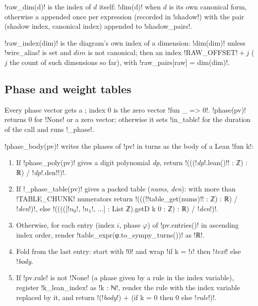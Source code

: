 {\py!raw_dim(d)! is the index of $d$ itself: \py!dim(d)! when $d$ is its own canonical form,
otherwise a  appended once per expression (recorded in \py!shadow!) with the
pair (shadow index, canonical index) appended to \py!shadow_pairs!.

\py!raw_index(dim)! is the diagram's own index of a dimension: \py!dim(dim)! unless
\py!wire_alias! is set and $\textit{dim}$ is not canonical; then an index
\py!RAW_OFFSET!${}+j$ ($j$ the count of such dimensions so far), with
\py!raw_pairs[raw] = dim(dim)!.

\subsection{Phase and weight tables}\label{sec:lean-export-net-phases}

Every phase vector gets a ; index 0 is the zero vector \code!fun _ => 0!.
\py!phase(pv)! returns 0 for \py!None! or a zero vector; otherwise it sets \py!in_table! for the
duration of the call and runs \py!_phase!.

\begin{algorithm}\label{alg:lean-export-net-phase-body}
\py!phase_body(pv)! writes the phases of \py!pv! in turns as the body of a Lean
\code!fun k!:
\begin{enumerate}
\item If \py!phase_poly(pv)! gives a digit polynomial \textit{dp}, return
  \code!(((!\textit{dp}\py!.lean()!\leanx! : ℤ) : ℝ) / !\textit{dp}\py!.den!\code!)!.
\item If \py!_phase_table(pv)! gives a packed table (\textit{nums}, \textit{den}): with more than
  \py!TABLE_CHUNK! numerators return
  \code!(((!\py!table_get(nums)!\leanx! : ℤ) : ℝ) / !\textit{den}\code!)!, else
  \code!(((([!$n_0$\code!, !$n_1$\leanx!, ...] : List ℤ).getD k 0 : ℤ) : ℝ) / !\textit{den}\code!)!.
\item Otherwise, for each entry (index $i$, phase $\varphi$) of \py!pv.entries()! in ascending index order,
  render \leanx!table_expr(φ.to_sympy_turns())! as \leanx!ℝ!.
\item Fold from the last entry: start with \code!0! and wrap
  \code!if k = !$i$\code! then !\textit{text}\code! else !\textit{body}.
\item If \py!pv.rule! is not \py!None! (a phase given by a rule in the index variable), register
  \code!k_lean_index! as \code!k : ℕ!, render the rule with the index variable replaced by it, and
  return \code!(!\textit{body}\code!) + (if k = 0 then 0 else !\textit{rule}\code!)!.
\end{enumerate}
\end{algorithm}

}
